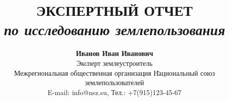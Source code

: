 
\newcommand{\DefaultOrganizationName}{Межрегиональная общественная организация \"Национальный союз землепользователей\"}
\newcommand{\DefaultOrganizationAddress}{125009, г. Москва, пер. Старопименовский, д. 13, стр 4}
\newcommand{\DefaultOrganizationPhone}{+7(915)123-45-67}
\newcommand{\DefaultOrganizationEmail}{info@nsz.su}
\newcommand{\DefaultOrganizationWebsite}{https://nsz.su/}

\newcommand{\DefaultExpertName}{Иванов Иван Иванович}
\newcommand{\DefaultExpertPosition}{Эксперт землеустроитель}
\newcommand{\DefaultExpertContacts}{\texttt{+7(916)123-45-67}, \texttt{expert@yandex.ru}}

\newcommand{\DefaultReportTitle}{ЭКСПЕРТНЫЙ ОТЧЕТ}
\newcommand{\DefaultReportSubject}{по исследованию землепользования}
\newcommand{\DefaultReportCity}{Москва}
\newcommand{\DefaultReportYear}{\the\year}
\newcommand{\DefaultReportDate}{\the\year}

\newcommand{\DefaultHeaderText}{Экспертное заключение}


\newcommand{\OrganizationName}{\DefaultOrganizationName}
\newcommand{\OrganizationAddress}{\DefaultOrganizationAddress}
\newcommand{\OrganizationPhone}{\DefaultOrganizationPhone}
\newcommand{\OrganizationEmail}{\DefaultOrganizationEmail}
\newcommand{\OrganizationWebsite}{\DefaultOrganizationWebsite}

\newcommand{\ExpertName}{\DefaultExpertName}
\newcommand{\ExpertPosition}{\DefaultExpertPosition}
\newcommand{\ExpertContacts}{\DefaultExpertContacts}

\newcommand{\ReportTitle}{\DefaultReportTitle}
\newcommand{\ReportSubject}{\DefaultReportSubject}
\newcommand{\ReportCity}{\DefaultReportCity}
\newcommand{\ReportYear}{\DefaultReportYear}
\newcommand{\ReportDate}{\DefaultReportDate}

\newcommand{\HeaderText}{\DefaultHeaderText}

 \title{
     \LARGE\textbf{\ReportTitle} \\
     \large\textit{\ReportSubject}
 }
 
 \author{
     \small\textbf{\ExpertName} \\[4pt]
     \small \ExpertPosition \\
     \small \OrganizationName \\
     \small {E-mail: \OrganizationEmail}, \small {Тел.: \OrganizationPhone}
 }
 
 \date{
     \small\textbf{\ReportDate} \\[4pt]
 }

